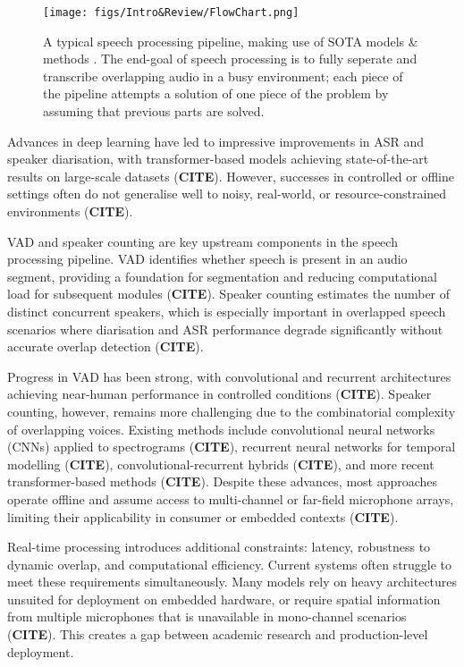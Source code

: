 \begin{figure}[H]
\centering
\centerline{\texttt{[image: figs/Intro\&Review/FlowChart.png]}}
\caption{A typical speech processing pipeline, making use of SOTA models \& methods \cite{pyannote2020, multidecoder_dprnn,openAIwhisper,cosine_similarity}. The end-goal of speech processing is to fully seperate and transcribe overlapping audio in a busy environment; each piece of the pipeline attempts a solution of one piece of the problem by assuming that previous parts are solved.}
\label{fig:pipeline}
\end{figure}

Advances in deep learning have led to impressive improvements in ASR and speaker diarisation, with transformer-based models achieving state-of-the-art results on large-scale datasets (\textbf{CITE}). However, successes in controlled or offline settings often do not generalise well to noisy, real-world, or resource-constrained environments (\textbf{CITE}).


VAD and speaker counting are key upstream components in the speech processing pipeline. VAD identifies whether speech is present in an audio segment, providing a foundation for segmentation and reducing computational load for subsequent modules (\textbf{CITE}). Speaker counting estimates the number of distinct concurrent speakers, which is especially important in overlapped speech scenarios where diarisation and ASR performance degrade significantly without accurate overlap detection (\textbf{CITE}).

Progress in VAD has been strong, with convolutional and recurrent architectures achieving near-human performance in controlled conditions (\textbf{CITE}). Speaker counting, however, remains more challenging due to the combinatorial complexity of overlapping voices. Existing methods include convolutional neural networks (CNNs) applied to spectrograms (\textbf{CITE}), recurrent neural networks for temporal modelling (\textbf{CITE}), convolutional-recurrent hybrids (\textbf{CITE}), and more recent transformer-based methods (\textbf{CITE}). Despite these advances, most approaches operate offline and assume access to multi-channel or far-field microphone arrays, limiting their applicability in consumer or embedded contexts (\textbf{CITE}).

Real-time processing introduces additional constraints: latency, robustness to dynamic overlap, and computational efficiency. Current systems often struggle to meet these requirements simultaneously. Many models rely on heavy architectures unsuited for deployment on embedded hardware, or require spatial information from multiple microphones that is unavailable in mono-channel scenarios (\textbf{CITE}). This creates a gap between academic research and production-level deployment.


